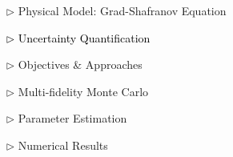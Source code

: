 \documentclass{beamer}
\begin{document}
\begin{frame}[c]
\large 	
\textcolor{mygray1}{
    \begin{itemize}[leftmargin=5pt] 
        \item[$\triangleright$]  Physical Model: Grad-Shafranov Equation
        \vspace{0.2cm}	
        \item[\textcolor{black}{$\triangleright$}] \textcolor{black}{\fontsize{25}{60}\selectfont Uncertainty Quantification}
        \vspace{0.2cm}
        \item[$\triangleright$] Objectives \& Approaches
        \vspace{0.2cm}
        \item[$\triangleright$] Multi-fidelity Monte Carlo
        \vspace{0.2cm}
        \item[$\triangleright$] Parameter Estimation
        \vspace{0.2cm}
        \item[$\triangleright$] Numerical Results
    \end{itemize}
}
\end{frame}
\end{document}
